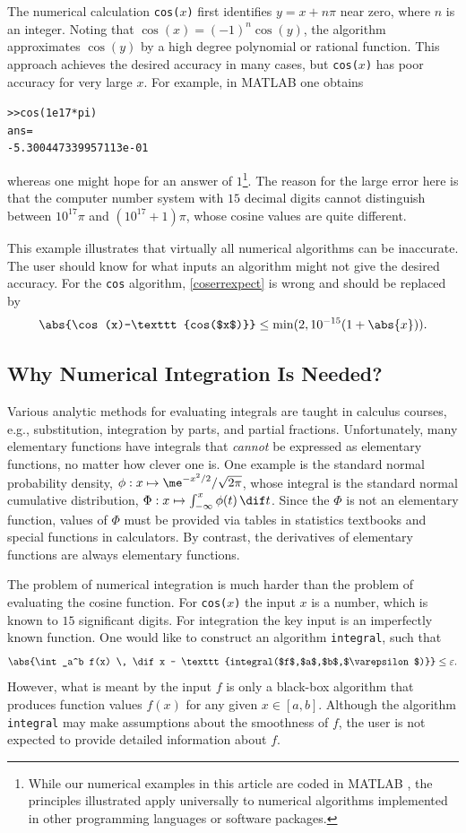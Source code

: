 \documentclass[]{article}
\newcommand{\integ}{\texttt{integral}\xspace}
\theoremstyle{definition}
\theoremstyle{remark}
\begin{document}
The numerical calculation \texttt{cos($x$)} first identifies $y=x+n\pi$ near zero, where $n$ is an integer. Noting that $\cos(x)=(-1)^n\cos(y)$, the algorithm approximates $\cos(y)$ by a high degree polynomial or rational function.  This approach achieves the desired accuracy in many cases, but \texttt{cos($x$)} has poor accuracy for very large $x$.  For example, in MATLAB one obtains
\begin{alltt}
>> cos(1e17*pi)
ans =
    -5.300447339957113e-01
\end{alltt}
whereas one might hope for an answer of $1$\footnote{While our numerical examples in this article are coded in MATLAB \cite{MAT8.1}, the principles illustrated apply universally to numerical algorithms implemented in other programming languages or software packages.}.   The reason for the large error here is that the computer number system with $15$ decimal digits cannot distinguish between $10^{17}\pi$ and $(10^{17}+1)\pi$, whose cosine values are quite different. 

This example illustrates that virtually all numerical algorithms can be inaccurate.  The user should know for what inputs an algorithm might not give the desired accuracy.  For the \texttt{cos} algorithm, \eqref{coserrexpect} is wrong and should be replaced by 
\[
\abs{\cos(x)-\texttt{cos($x$)}} \le \min(2,10^{-15}(1+\abs{x})).
\]

\subsection{Why Numerical Integration Is Needed?}
Various analytic methods for evaluating integrals are taught in calculus courses, e.g., substitution, integration by parts, and partial fractions.  Unfortunately, many elementary functions have integrals that \emph{cannot} be expressed as elementary functions, no matter how clever one is.  One example is the standard normal probability density, $\phi: x \mapsto \me^{-x^2/2}/\sqrt{2 \pi}$, whose integral is the standard normal cumulative distribution, $\Phi : x \mapsto \int_{-\infty}^x \phi(t) \, \dif t$.  Since the $\Phi$ is not an elementary function, values of $\Phi$ must be provided via tables in statistics textbooks and special functions in calculators. By contrast, the derivatives of elementary functions are always elementary functions.  

The problem of numerical integration is much harder than the problem of evaluating the cosine function.  For \texttt{cos($x$)} the input $x$ is a number, which is known to $15$ significant digits.  For integration the key input is an imperfectly known function.  One would like to construct an algorithm \integ, such that
\begin{equation*}
\abs{\int_a^b f(x) \, \dif x - \texttt{integral($f$,$a$,$b$,$\varepsilon$)}} \le \varepsilon.
\end{equation*}
However, what is meant by the input $f$ is only a black-box algorithm that produces function values $f(x)$ for any given $x \in [a,b]$.  Although the algorithm \integ may make assumptions about the smoothness of $f$, the user is not expected to provide detailed information about $f$.
\end{document}
